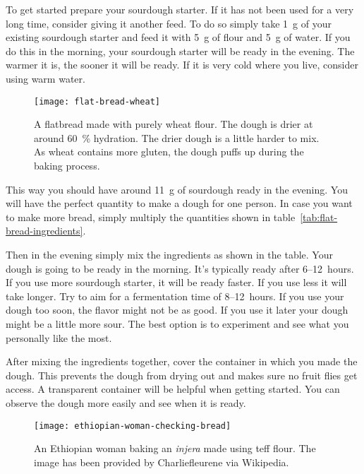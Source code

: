 To get started prepare your sourdough starter. If it has not been used for a very
long time, consider giving it another feed. To do so simply take \qty{1}{\gram} of your
existing sourdough starter and feed it with \qty{5}{\gram} of flour and \qty{5}{\gram} of water.
If you do this in the morning, your sourdough starter will be ready in the evening. The
warmer it is, the sooner it will be ready. If it is very cold where you live, consider
using warm water.

\begin{figure}[htb!]
\begin{center}
  \texttt{[image: flat-bread-wheat]}
  \caption{A flatbread made with purely wheat flour. The dough is drier
  at around \qty{60}{\percent} hydration. The drier dough is a little harder
  to mix. As wheat contains more gluten, the dough puffs up during
  the baking process.}
\end{center}
\end{figure}

This way you should have around \qty{11}{\gram} of sourdough ready in the evening. You will have
the perfect quantity to make a dough for one person. In case you want to make more
bread, simply multiply the quantities shown in table~\ref*{tab:flat-bread-ingredients}.

Then in the evening simply mix the ingredients as shown in the table. Your dough
is going to be ready in the morning. It's typically ready after 6--12~hours. If
you use more sourdough starter, it will be ready faster. If you use less it will take
longer. Try to aim for a fermentation time of 8--12~hours. If you use
your dough too soon, the flavor might not be as good. If you use it later
your dough might be a little more sour. The best option is to experiment
and see what you personally like the most.

After mixing the ingredients together, cover the container in which
you made the dough. This prevents the dough from drying out and makes
sure no fruit flies get access. A transparent container will be helpful
when getting started. You can observe the dough more easily and see when
it is ready.

\begin{figure}[htb!]
\begin{center}
  \texttt{[image: ethiopian-woman-checking-bread]}
  \caption{An Ethiopian woman baking an \emph{injera} made using teff flour.
  The image has been provided by Charliefleurene via Wikipedia.}
\end{center}
\end{figure}

